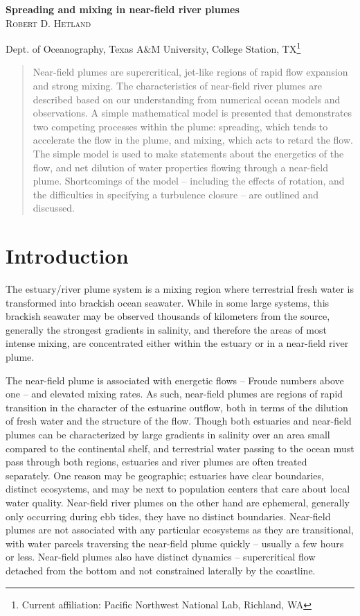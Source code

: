 \documentclass[12pt]{article}
\begin{document}
\vfill
\noindent
{\large\bfseries Spreading and mixing in near-field river plumes}\\
\noindent
{\scshape Robert D. Hetland}\\
\noindent
{\footnotesize Dept. of Oceanography, Texas A\&M University, College Station, TX\footnote{Current affiliation: Pacific Northwest National Lab, Richland, WA}


\begin{abstract}
  \small{Near-field plumes are supercritical, jet-like regions of rapid flow expansion and strong mixing. The characteristics of near-field river plumes are described based on our understanding from numerical ocean models and observations. A simple mathematical model is presented that demonstrates two competing processes within the plume: spreading, which tends to accelerate the flow in the plume, and mixing, which acts to retard the flow. The simple model is used to make statements about the energetics of the flow, and net dilution of water properties flowing through a near-field plume. Shortcomings of the model -- including the effects of rotation, and the difficulties in specifying a turbulence closure -- are outlined and discussed.}
\end{abstract}


\section{Introduction}

The estuary/river plume system is a mixing region where terrestrial fresh water is transformed into brackish ocean seawater. While in some large systems, this brackish seawater may be observed thousands of kilometers from the source, generally the strongest gradients in salinity, and therefore the areas of most intense mixing, are concentrated either within the estuary or in a near-field river plume. 

The near-field plume is associated with energetic flows -- Froude numbers above one -- and elevated mixing rates. As such, near-field plumes are regions of rapid transition in the character of the estuarine outflow, both in terms of the dilution of fresh water and the structure of the flow. Though both estuaries and near-field plumes can be characterized by large gradients in salinity over an area small compared to the continental shelf, and terrestrial water passing to the ocean must pass through both regions, estuaries and river plumes are often treated separately. One reason may be geographic; estuaries have clear boundaries, distinct ecosystems, and may be next to population centers that care about local water quality. Near-field river plumes on the other hand are ephemeral, generally only occurring during ebb tides, they have no distinct boundaries. Near-field plumes are not associated with any particular ecosystems as they are transitional, with water parcels traversing the near-field plume quickly -- usually a few hours or less. Near-field plumes also have distinct dynamics -- supercritical flow detached from the bottom and not constrained laterally by the coastline.

}
\end{document}
